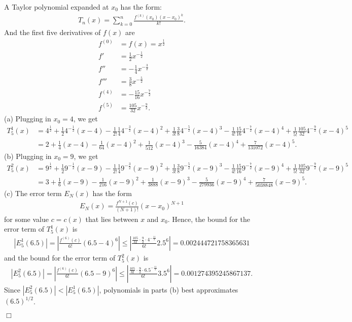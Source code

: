 \documentclass[UTF8,12pt,hyperref]{ctexart}
\newenvironment{solve}[1][\color{blue}\bf Solve]{\begin{trivlist}
\item[\hskip \labelsep {\color{blue}\bfseries
#1}]}{\hfill$\Box$\end{trivlist}}
\begin{document}
\begin{solve}
    A Taylor polynomial expanded at $x_0$ has the form:
    \begin{align*}
       T_n(x) =\sum\limits_{k=0}^{n}\frac{f^{(k)}(x_0)(x-x_0)^k}{k!}.
    \end{align*} 
    And the first five derivatives of $f(x)$ are
    \begin{align*}
      f^{(0)}&=f(x)=x^{\frac{1}{2}}\\
      f'&=\frac{1}{2}x^{-\frac{1}{2}}\\
      f''&=-\frac{1}{4}x^{-\frac{3}{2}}\\
      f'''&=\frac{3}{8}x^{-\frac{5}{2}}\\
      f^{(4)} &= -\frac{15}{16} x^{-\frac{7}{2}}\\
      f^{(5)} &= \frac{105}{32} x^{-\frac{9}{2}}.
    \end{align*}
    (a) Plugging in $x_0=4$, we get
    \begin{align*}
      T_5^1(x) &= 4^{\frac{1}{2}} + \frac{1}{2}4^{-\frac{1}{2}}(x-4)-\frac{1}{2!}\frac{1}{4}4^{-\frac{3}{2}}(x-4)^2 +
      \frac{1}{3!}\frac{3}{8}4^{-\frac{5}{2}}(x-4)^3-\frac{1}{4!}\frac{15}{16}4^{-\frac{7}{2}}(x-4)^4
      +\frac{1}{5!}\frac{105}{32}4^{-\frac{9}{2}}(x-4)^5\\
      &= 2+\frac{1}{4}(x-4)-\frac{1}{64}(x-4)^2 + \frac{1}{512}(x-4)^3-\frac{5}{16384}(x-4)^4 + \frac{7}{131072}(x-4)^5.
    \end{align*}
    (b) Plugging in $x_0=9$, we get
    \begin{align*}
      T_5^2(x) &= 9^{\frac{1}{2}} + \frac{1}{2}9^{-\frac{1}{2}}(x-9)-\frac{1}{2!}\frac{1}{4}9^{-\frac{3}{2}}(x-9)^2 +
      \frac{1}{3!}\frac{3}{8}9^{-\frac{5}{2}}(x-9)^3-\frac{1}{4!}\frac{15}{16}9^{-\frac{7}{2}}(x-9)^4
      +\frac{1}{5!}\frac{105}{32}9^{-\frac{9}{2}}(x-9)^5\\
      &= 3+\frac{1}{6}(x-9)-\frac{1}{216}(x-9)^2 + \frac{1}{3888}(x-9)^3-\frac{5}{279936}(x-9)^4 + \frac{7}{5038848}(x-9)^5.
    \end{align*}
    (c) The error term $E_N(x)$ has the form
    \begin{align*}
      E_N(x) =\frac{f^{N+1}(c)}{(N+1)!}(x-x_0)^{N+1}
    \end{align*}
    for some value $c = c(x)$ that lies between $x$ and $x_0$.
    Hence, the bound for the error term of $T^1_5(x)$ is 
    \begin{align*}
      |E_5^1(6.5)|=|\frac{f^{(6)}(c)}{6!}(6.5-4)^{6}| 
        \leqslant |\frac{\frac{105}{32}\cdot \frac{9}{2}\cdot 4^{-\frac{11}{2}}}{6!}2.5^6|
      = 0.002444721758365631
      \end{align*}
    and the bound for the error term of $T^2_5(x)$ is
    \begin{align*}
      |E_5^2(6.5)|=|\frac{f^{(6)}(c)}{6!}(6.5-9)^{6}| 
        \leqslant |\frac{\frac{105}{32}\cdot \frac{9}{2}\cdot 6.5^{-\frac{11}{2}}}{6!}3.5^6|
      = 0.001274395245867137.
    \end{align*}
    Since $|E^2_5(6.5)|<|E^1_5(6.5)|$, 
    polynomials in parts (b) best approximates $(6.5)^{1/2}$.


  \end{solve}

  
\end{document}
